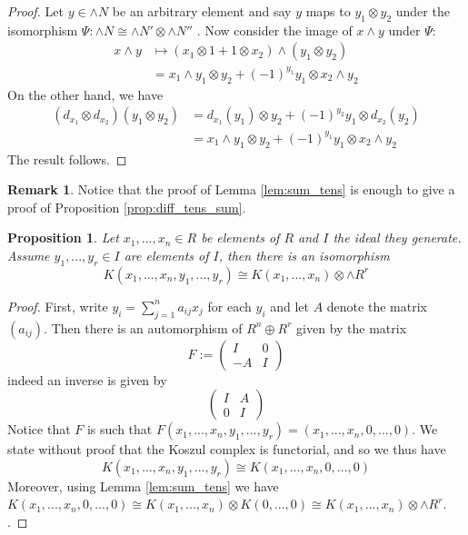 \documentclass[12pt]{article}
\theoremstyle{plain}
\newtheorem{proposition}[thm]{Proposition}
\theoremstyle{definition}
\newtheorem{remark}[thm]{Remark}
\begin{document}
\begin{proof}
Let $y \in \wedge N$ be an arbitrary element and say $y$ maps to $y_1 \otimes y_2$ under the isomorphism $\Psi: \wedge N \cong \wedge N' \otimes \wedge N''$ . Now consider the image of $x \wedge y$ under $\Psi$:
\begin{align*}
x \wedge y &\longmapsto (x_1 \otimes 1 + 1 \otimes x_2) \wedge (y_1 \otimes y_2)\\
&= x_1 \wedge y_1 \otimes y_2 + (-1)^{y_1}y_1 \otimes x_2 \wedge y_2
\end{align*}
On the other hand, we have
\begin{align*}
(d_{x_1} \otimes d_{x_2})(y_1 \otimes y_2) &= d_{x_1}(y_1) \otimes y_2 + (-1)^{y_2}y_1 \otimes d_{x_2}(y_2)\\
&= x_1 \wedge y_1 \otimes y_2 + (-1)^{y_1}y_1 \otimes x_2 \wedge y_2
\end{align*}
The result follows.
\end{proof}
\begin{remark}
Notice that the proof of Lemma \ref{lem:sum_tens} is enough to give a proof of Proposition \ref{prop:diff_tens_sum}.
\end{remark}
\begin{proposition}\label{prop:in_gen_ideal}
Let $x_1,...,x_n \in R$ be elements of $R$ and $I$ the ideal they generate. Assume $y_1,...,y_r \in I$ are elements of $I$, then there is an isomorphism
\begin{equation}
K(x_1,...,x_n,y_1,...,y_r) \cong K(x_1,...,x_n) \otimes \wedge R^r
\end{equation}
\end{proposition}
\begin{proof}
First, write $y_i = \sum_{j = 1}^n a_{ij}x_j$ for each $y_i$ and let $A$ denote the matrix $(a_{ij})$. Then there is an automorphism of $R^n \oplus R^r$ given by the matrix
\begin{equation}
F:= \begin{pmatrix}
I & 0\\
-A & I
\end{pmatrix}
\end{equation}
indeed an inverse is given by
\begin{equation}
\begin{pmatrix}
I & A\\
0 & I
\end{pmatrix}
\end{equation}
Notice that $F$ is such that $F(x_1,...,x_n,y_1,...,y_r) = (x_1,...,x_n,0,...,0)$.  We state without proof that the Koszul complex is functorial, and so we thus have
\begin{equation}
K(x_1,...,x_n,y_1,...,y_r) \cong K(x_1,...,x_n,0,...,0)
\end{equation}
Moreover, using Lemma \ref{lem:sum_tens} we have $K(x_1,...,x_n,0,...,0) \cong K(x_1,...,x_n) \otimes K(0,...,0) \cong K(x_1,...,x_n) \otimes \wedge R^r$. .
\end{proof}
\end{document}
